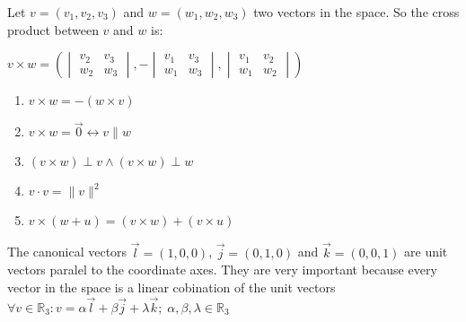 \begin{definition}
  Let $v = (v_{\scriptstyle{1}}, v_{\scriptstyle{2}}, v_{\scriptstyle{3}})$ and $w = (w_{\scriptstyle{1}}, w_{\scriptstyle{2}}, w_{\scriptstyle{3}})$ two vectors in the space. 
  So the cross product between $v$ and $w$ is:

  $v \times w = \left( 
    \begin{vmatrix} v_{\scriptstyle{2}} & v_{\scriptstyle{3}} \\ w_{\scriptstyle{2}} & w_{\scriptstyle{3}} \end{vmatrix},
   -\begin{vmatrix} v_{\scriptstyle{1}} & v_{\scriptstyle{3}} \\ w_{\scriptstyle{1}} & w_{\scriptstyle{3}} \end{vmatrix},
    \begin{vmatrix} v_{\scriptstyle{1}} & v_{\scriptstyle{2}} \\ w_{\scriptstyle{1}} & w_{\scriptstyle{2}} \end{vmatrix}
   \right) $ 
\end{definition}

\begin{theorem}
  \hspace{10em}
  \begin{enumerate}
    \item $v \times w = -(w \times v)$
    \item $v \times w = \vec{0} \leftrightarrow v \parallel w$
    \item $(v \times w) \perp v \land (v \times w) \perp w$
    \item $v \cdot v = \|v\| ^ 2$
    \item $v \times (w + u) = (v \times w) + (v \times u)$
  \end{enumerate}
\end{theorem}

\pagebreak
\begin{note}
  The canonical vectors $\vec{l} = (1,0,0)$, $\vec{j} = (0,1,0)$ and $\vec{k} = (0,0,1)$ are unit vectors paralel to the coordinate axes.
  They are very important because every vector in the space is a linear cobination of the unit vectors \\

  $\forall v \in \mathbb{R}_{\scriptstyle{3}}: v = \alpha \vec{l} + \beta \vec{j} + \lambda \vec{k}; \; \alpha, \beta, \lambda \in \mathbb{R}_{\scriptstyle{3}}$

\end{note}

